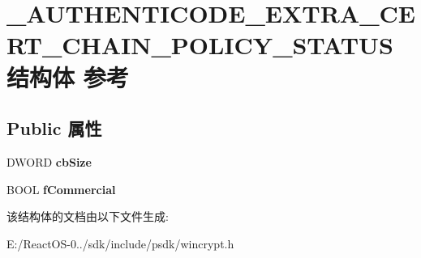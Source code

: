 \hypertarget{struct___a_u_t_h_e_n_t_i_c_o_d_e___e_x_t_r_a___c_e_r_t___c_h_a_i_n___p_o_l_i_c_y___s_t_a_t_u_s}{}\section{\+\_\+\+A\+U\+T\+H\+E\+N\+T\+I\+C\+O\+D\+E\+\_\+\+E\+X\+T\+R\+A\+\_\+\+C\+E\+R\+T\+\_\+\+C\+H\+A\+I\+N\+\_\+\+P\+O\+L\+I\+C\+Y\+\_\+\+S\+T\+A\+T\+U\+S结构体 参考}
\label{struct___a_u_t_h_e_n_t_i_c_o_d_e___e_x_t_r_a___c_e_r_t___c_h_a_i_n___p_o_l_i_c_y___s_t_a_t_u_s}
\subsection*{Public 属性}
\begin{DoxyCompactItemize}
\item 
\mbox{\label{struct___a_u_t_h_e_n_t_i_c_o_d_e___e_x_t_r_a___c_e_r_t___c_h_a_i_n___p_o_l_i_c_y___s_t_a_t_u_s_a3b6df07dc54cea6e4d1771b034472fc6}} 
D\+W\+O\+RD {\bfseries cb\+Size}
\item 
\mbox{\label{struct___a_u_t_h_e_n_t_i_c_o_d_e___e_x_t_r_a___c_e_r_t___c_h_a_i_n___p_o_l_i_c_y___s_t_a_t_u_s_aebaf41faecb5fc173b24535f96bcc53e}} 
B\+O\+OL {\bfseries f\+Commercial}
\end{DoxyCompactItemize}


该结构体的文档由以下文件生成\+:\begin{DoxyCompactItemize}
\item 
E\+:/\+React\+O\+S-\/0../sdk/include/psdk/wincrypt.\+h\end{DoxyCompactItemize}
